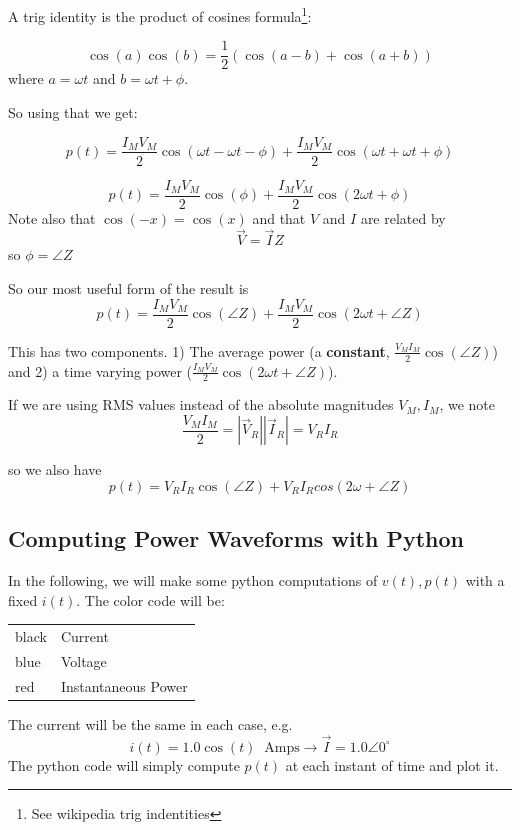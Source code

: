 \noindent A trig identity is the  product of cosines formula\footnote{See wikipedia trig indentities}:

\[
\cos(a) \cos(b) = \frac {1} {2} (\cos(a-b) + \cos(a+b))
\]
where $a=\omega t$ and $b=\omega t + \phi$.

So using that we get:

\[
p(t) = \frac{I_M V_M }{2} \cos(\omega t -\omega t - \phi) + \frac{I_M V_M}{2} \cos(\omega t + \omega t + \phi )
\]

\[
p(t) = \frac{I_M V_M }{2} \cos( \phi) + \frac{I_M V_M}{2} \cos(2\omega t + \phi )
\]
Note also that $\cos(-x) = \cos(x)$ and that $V$ and $I$ are related by
\[
\vec V = \vec I Z
\]
so $\phi = \angle {Z}$

So our most useful form of the result is
\[
p(t) = \frac{I_M V_M }{2} \cos( \angle{Z}) + \frac{I_M V_M}{2} \cos(2\omega t + \angle{Z})
\]

This has two components.
1) The average power (a {\bf constant}, $\frac{V_M I_M}{2} \cos(\angle Z)$) and
2) a time varying power ($\frac{I_M V_M}{2} \cos(2\omega t   + \angle Z)$).

If we are using RMS values instead of the absolute magnitudes $V_M, I_M$,
we note
\[
\frac {V_MI_M}  {2} = |\vec V_R||\vec I_R| = V_R I_R
\]

so we also have
\[
p(t) = V_RI_R\cos(\angle{Z}) + V_RI_Rcos(2\omega+\angle{Z})
\]

\subsection{Computing Power Waveforms with Python}

\vspace{0.3in}
In the following, we will make some python computations of $v(t), p(t)$
with a fixed $i(t)$.   The color code will be:
\begin{center}
\begin{tabular}{l|l}\hline
black  &  Current \\
blue   &  Voltage \\
red    &  Instantaneous Power \\
\end{tabular}
\end{center}
The current will be the same in each case, e.g.
\[
i(t) = 1.0\cos(t) \;\; \text{Amps} \to  \vec I = 1.0 \angle 0^\circ
\]
The python code will simply compute $p(t)$ at each instant of time and plot it.

